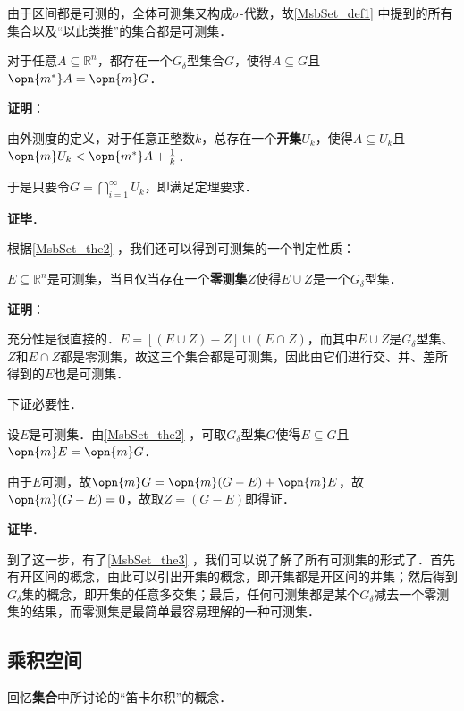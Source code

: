 由于区间都是可测的，全体可测集又构成$\sigma$-代数，故\autoref{MsbSet_def1} 中提到的所有集合以及“以此类推”的集合都是可测集．




\begin{theorem}{}\label{MsbSet_the2}
对于任意$A\subseteq \mathbb{R}^n$，都存在一个$G_\delta$型集合$G$，使得$A\subseteq G$且$\opn{m^*}A=\opn{m}G$．
\end{theorem}

\textbf{证明}：

由外测度的定义，对于任意正整数$k$，总存在一个\textbf{开集}$U_k$，使得$A\subseteq U_k$且$\opn{m}U_k<\opn{m^*}A+\frac{1}{k}$．

于是只要令$G=\bigcap_{i=1}^\infty U_k$，即满足定理要求．

\textbf{证毕}．








根据\autoref{MsbSet_the2} ，我们还可以得到可测集的一个判定性质：

\begin{theorem}{}\label{MsbSet_the3}
$E\subseteq \mathbb{R}^n$是可测集，当且仅当存在一个\textbf{零测集}$Z$使得$E\cup Z$是一个$G_\delta$型集．
\end{theorem}

\textbf{证明}：

充分性是很直接的．$E=[(E\cup Z)-Z]\cup(E\cap Z)$，而其中$E\cup Z$是$G_\delta$型集、$Z$和$E\cap Z$都是零测集，故这三个集合都是可测集，因此由它们进行交、并、差所得到的$E$也是可测集．

下证必要性．

设$E$是可测集．由\autoref{MsbSet_the2} ，可取$G_\delta$型集$G$使得$E\subseteq G$且$\opn{m}E=\opn{m}G$．

由于$E$可测，故$\opn{m}G=\opn{m}(G-E)+\opn{m}E$，故$\opn{m}(G-E)=0$，故取$Z=(G-E)$即得证．

\textbf{证毕}．

到了这一步，有了\autoref{MsbSet_the3} ，我们可以说了解了所有可测集的形式了．首先有开区间的概念，由此可以引出开集的概念，即开集都是开区间的并集；然后得到$G_\delta$集的概念，即开集的任意多交集；最后，任何可测集都是某个$G_\delta$减去一个零测集的结果，而零测集是最简单最容易理解的一种可测集．


\subsection{乘积空间}

回忆\textbf{集合}中所讨论的“笛卡尔积”的概念．

